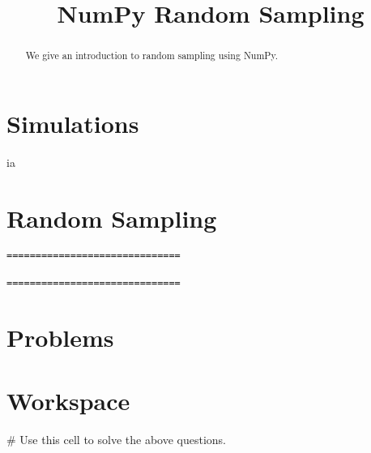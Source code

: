 \documentclass{ximera}
\title{NumPy Random Sampling}
\begin{document}
  
\begin{abstract}  
We give an introduction to random sampling using NumPy.
\end{abstract}  
\maketitle

\section{Simulations}

ia

\section{Random Sampling}

\begin{verbatim}
==============================

==============================
\end{verbatim}


\section{Problems}

\begin{question}
\end{question}

\begin{question}
\end{question}

\begin{question}
\end{question}

\section{Workspace}

\begin{sageCell}
# Use this cell to solve the above questions.
\end{sageCell}
\end{document}
